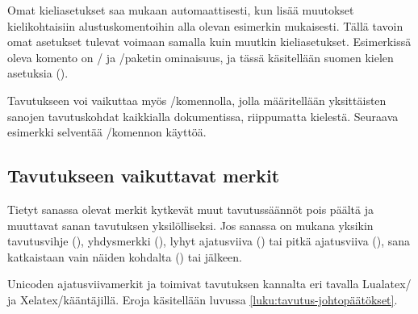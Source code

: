 Omat kieli\-asetukset saa mukaan automaattisesti, kun lisää muutokset
kielikohtaisiin alustuskomentoihin alla olevan esimerkin mukaisesti.
Tällä tavoin omat asetukset tulevat voimaan samalla kuin muutkin
kie\-li\-ase\-tuk\-set. Esimerkissä oleva komento 
on \-/{} ja \-/paketin ominaisuus,
ja tässä käsitellään suomen kielen asetuksia ().

\begin{koodilohkosis}
\end{koodilohkosis}

Tavutukseen voi vaikuttaa myös \-/komennolla,
jolla määritellään yksittäisten sanojen tavutuskohdat kaikkialla
dokumentissa, riippumatta kielestä. Seuraava esimerkki selventää
\-/komennon käyttöä.

\begin{koodilohkosis}
\end{koodilohkosis}

\subsection{Tavutukseen vaikuttavat merkit}

Tietyt sanassa olevat merkit kytkevät muut tavutussäännöt pois päältä ja
muuttavat sanan tavutuksen yksilölliseksi. Jos sanassa on mukana yksikin
tavutusvihje (\koodi{\keno-}), yhdysmerkki (\koodi{-}), lyhyt
ajatusviiva (\mbox{\koodi{--}}) tai pitkä ajatusviiva
(\mbox{\koodi{---}}), sana katkaistaan vain näiden kohdalta
(\koodi{\keno-}) tai jälkeen.

Unicoden ajatusviivamerkit  ja  toimivat tavutuksen kannalta eri tavalla Lualatex\-/{} ja
Xelatex\-/kääntäjillä. Eroja käsitellään luvussa
\ref{luku:tavutus-johtopäätökset}.

